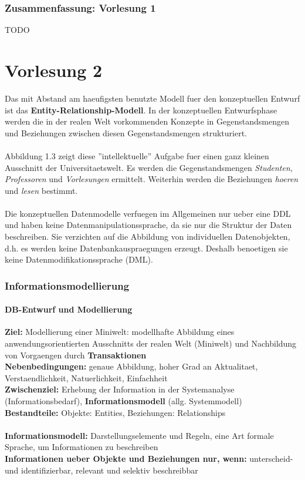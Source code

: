 \documentclass[a4paper,10pt]{article}
\begin{document}
\section{Zusammenfassung: Vorlesung 1}
TODO

\newpage
\part*{Vorlesung 2}
Das mit Abstand am haeufigsten benutzte Modell fuer den konzeptuellen Entwurf ist das \textbf{Entity-Relationship-Modell}. In der konzeptuellen Entwurfsphase werden die in der realen Welt vorkommenden Konzepte in Gegenstandsmengen und Beziehungen zwischen diesen Gegenstandsmengen strukturiert.
\\~\\
Abbildung 1.3 zeigt diese ''intellektuelle'' Aufgabe fuer einen ganz kleinen Ausschnitt der Universitaetswelt. Es werden die Gegenstandsmengen \emph{Studenten, Professoren} und \emph{Vorlesungen} ermittelt. Weiterhin werden die Beziehungen \emph{hoeren} und \emph{lesen} bestimmt.
\\~\\
Die konzeptuellen Datenmodelle verfuegen im Allgemeinen nur ueber eine DDL und haben keine Datenmanipulationssprache, da sie nur die Struktur der Daten beschreiben. Sie verzichten auf die Abbildung von individuellen Datenobjekten, d.h. es werden keine Datenbankauspraegungen erzeugt. Deshalb benoetigen sie keine Datenmodifikationssprache (DML).

\section{Informationsmodellierung}

\subsection{DB-Entwurf und Modellierung}
\textbf{Ziel:} Modellierung einer Miniwelt: modellhafte Abbildung eines anwendungsorientierten Ausschnitts der realen Welt (Miniwelt) und Nachbildung von Vorgaengen durch \textbf{Transaktionen}\\
\textbf{Nebenbedingungen:} genaue Abbildung, hoher Grad an Aktualitaet, Verstaendlichkeit, Natuerlichkeit, Einfachheit\\
\textbf{Zwischenziel:} Erhebung der Information in der Systemanalyse (Informationsbedarf), \textbf{Informationsmodell} (allg. Systemmodell)\\
\textbf{Bestandteile:} Objekte: Entities, Beziehungen: Relationships
\\~\\
\textbf{Informationsmodell:} Darstellungselemente und Regeln, eine Art formale Sprache, um Informationen zu beschreiben\\
\textbf{Informationen ueber Objekte und Beziehungen nur, wenn:} unterscheid- und identifizierbar, relevant und selektiv beschreibbar
\end{document}
